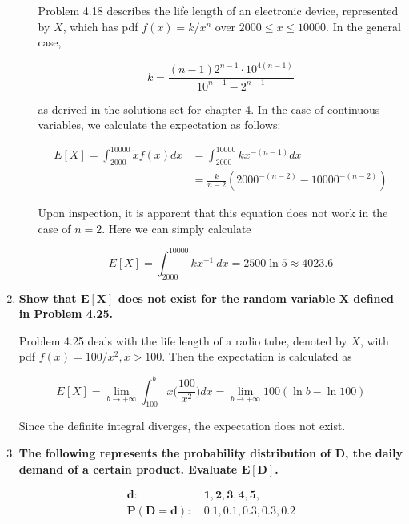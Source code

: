\documentclass[10pt, oneside]{article}   	%
\theoremstyle{definition}
\begin{document}
\begin{enumerate}[label=7.\arabic*]
\begin{enumerate}
	Problem 4.18 describes the life length of an electronic device, represented by $X$, which has pdf $f(x) = k / x^n$ over $2000 \leq x \leq 10000$. In the general case,
	
	\[ k = \frac{(n-1) 2^{n-1} \cdot 10^{4(n-1)}}{10^{n-1} - 2^{n-1}} \]
	
	as derived in the solutions set for chapter 4. In the case of continuous variables, we calculate the expectation as follows:
	
	\begin{align*}
	E[X] = \int^{10000}_{2000} x f(x) dx &= \int^{10000}_{2000} kx^{-(n-1)} dx \\
	&= \boxed{ \frac{k}{n-2} (2000^{-(n-2)} - 10000^{-(n-2)})  }
	\end{align*}
	
	Upon inspection, it is apparent that this equation does not work in the case of $n = 2$. Here we can simply calculate
	
	\[ E[X] = \int^{10000}_{2000} kx^{-1} \ dx = 2500 \ln 5 \approx \boxed{4023.6} \]
	
	\end{enumerate}
	
\item  \begin{tcolorbox}[
  colback=Cerulean!5!white,
  colframe=Cerulean!75!black]
\textbf{Show that $\bm{E[X]}$ does not exist for the random variable $\bm{X}$ defined in Problem 4.25.}
\end{tcolorbox}

Problem 4.25 deals with the life length of a radio tube, denoted by $X$, with pdf $f(x) = 100/x^2, x > 100$. Then the expectation is calculated as

\[ E[X] = \lim_{b \rightarrow +\infty} \int^b_{100} x \Big( \frac{100}{x^2} \Big) dx =  \lim_{b \rightarrow + \infty} 100 (\ln b - \ln 100)\] 

Since the definite integral diverges, the expectation does not exist.

\item  \begin{tcolorbox}[
  colback=Cerulean!5!white,
  colframe=Cerulean!75!black]
\textbf{The following represents the probability distribution of $\bm{D}$, the daily demand of a certain product. Evaluate $\bm{E[D]}$.}

\begin{align*}
\bm{d:}& \ \bm{1, 2, 3, 4, 5,} \\
\bm{P(D = d):}& \ \bm{0.1, 0.1, 0.3, 0.3, 0.2}
\end{align*}
\end{tcolorbox}


\end{enumerate}
\end{document}
